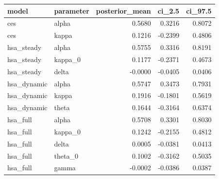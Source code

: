 \begin{tabular}{llrrr}
\toprule
model & parameter & posterior\_mean & ci\_2.5 & ci\_97.5 \\
\midrule
ces & alpha & 0.5680 & 0.3216 & 0.8072 \\
ces & kappa & 0.1216 & -0.2399 & 0.4806 \\
hsa\_steady & alpha & 0.5755 & 0.3316 & 0.8191 \\
hsa\_steady & kappa\_0 & 0.1177 & -0.2371 & 0.4673 \\
hsa\_steady & delta & -0.0000 & -0.0405 & 0.0406 \\
hsa\_dynamic & alpha & 0.5747 & 0.3473 & 0.7931 \\
hsa\_dynamic & kappa & 0.1916 & -0.1801 & 0.5619 \\
hsa\_dynamic & theta & 0.1644 & -0.3164 & 0.6374 \\
hsa\_full & alpha & 0.5708 & 0.3301 & 0.8030 \\
hsa\_full & kappa\_0 & 0.1242 & -0.2155 & 0.4812 \\
hsa\_full & delta & 0.0005 & -0.0381 & 0.0413 \\
hsa\_full & theta\_0 & 0.1002 & -0.3162 & 0.5035 \\
hsa\_full & gamma & -0.0002 & -0.0386 & 0.0387 \\
\bottomrule
\end{tabular}
